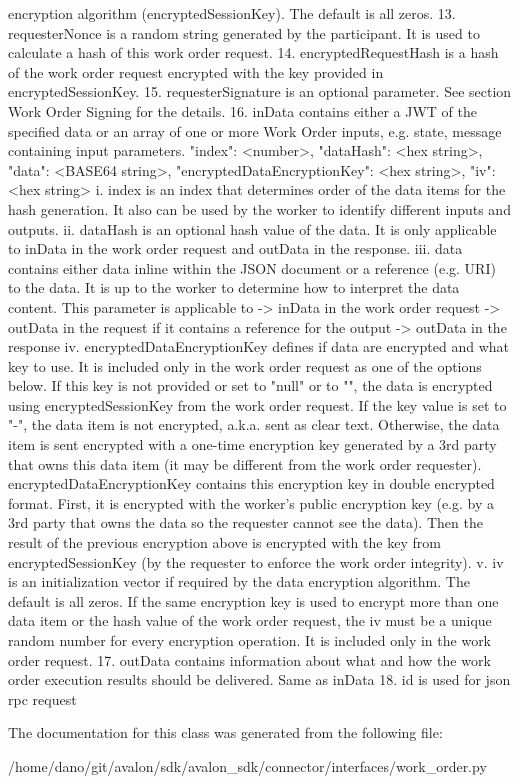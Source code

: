 \begin{DoxyVerb}
encryption algorithm (encryptedSessionKey). The default is all zeros.
13. requesterNonce is a random string generated by the participant.
It is used to calculate a hash of this work order request.
14. encryptedRequestHash is a hash of the work order request encrypted
with the key provided in encryptedSessionKey.
15. requesterSignature is an optional parameter. See section
Work Order Signing for the details.
16. inData contains either a JWT of the specified data or an array of
one or more Work Order inputs, e.g. state, message containing input
parameters.
{
    "index": <number>,
    "dataHash": <hex string>,
    "data": <BASE64 string>,
    "encryptedDataEncryptionKey": <hex string>,
    "iv": <hex string>
}
i. index is an index that determines order of the data items for the
hash generation. It also can be used by the worker to identify
different inputs and outputs.
ii. dataHash is an optional hash value of the data. It is only
applicable to inData in the work order request and outData in the
response.
iii. data contains either data inline within the JSON document or a
reference (e.g. URI) to the data. It is up to the worker to determine
how to interpret the data content. This parameter is applicable to
    -> inData in the work order request
    -> outData in the request if it contains a reference for the output
    -> outData in the response
iv. encryptedDataEncryptionKey defines if data are encrypted and what
key to use. It is included only in the work order request as one of the
options below.
If this key is not provided or set to "null" or to "", the data is
encrypted using encryptedSessionKey from the work order request.
If the key value is set to "-", the data item is not encrypted, a.k.a.
sent as clear text.
Otherwise, the data item is sent encrypted with a one-time encryption
key generated by a 3rd party that owns this data item (it may be
different from the work order requester).
encryptedDataEncryptionKey contains this encryption key in double
encrypted format.
First, it is encrypted with the worker's public encryption key (e.g. by
a 3rd party that owns the data so the requester cannot see the data).
Then the result of the previous encryption above is encrypted with the
key from encryptedSessionKey (by the requester to enforce the work
order integrity).
v. iv is an initialization vector if required by the data encryption
algorithm. The default is all zeros. If the same encryption key is
used to encrypt more than one data item or the hash value of the
work order request, the iv must be a unique random number for every
encryption operation. It is included only in the work order request.
17. outData contains information about what and how the work order
execution results should be delivered. Same as inData
18. id is used for json rpc request
\end{DoxyVerb}
 

The documentation for this class was generated from the following file\+:\begin{DoxyCompactItemize}
\item 
/home/dano/git/avalon/sdk/avalon\+\_\+sdk/connector/interfaces/work\+\_\+order.\+py\end{DoxyCompactItemize}
